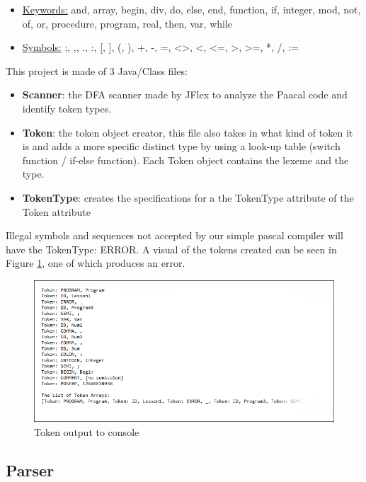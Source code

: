 \documentclass[english]{article}
\begin{document}
\renewcommand{\labelitemi}{$\textendash$}
\begin{itemize}
\item
\underline{Keywords:} and, array, begin, div, do, else, end, function, if, integer, mod, not, of, or, procedure, program, real, then, var, while
\item
\underline{Symbols:} ;, ,, ., :, [, ], (, ), +, -, =, \textless\textgreater, \textless, \textless=, \textgreater, \textgreater=, *, /, :=
\end{itemize}
This project is made of 3 Java/Class files:
\begin{itemize}

\item
\textbf{Scanner}: the DFA scanner made by JFlex to analyze the Paacal code and identify token types.
\item
\textbf{Token}: the token object creator, this file also takes in what kind of token it is and adds a more specific distinct type by using a look-up table (switch function / if-else function). Each Token object contains the lexeme and the type.
\item
\textbf{TokenType}: creates the specifications for a the TokenType attribute of the Token attribute
\end{itemize}
Illegal symbols and sequences not accepted by our simple pascal compiler will have the TokenType: ERROR. A visual of the tokens created can be seen in Figure \ref{Output}, one of which produces an error.

\begin{figure}
\begin{center}
\includegraphics[width=1.1\textwidth]{output.PNG}
\end{center}
\caption{\label{Output}Token output to console}
\end{figure}


\subsection{Parser}
\end{document}
